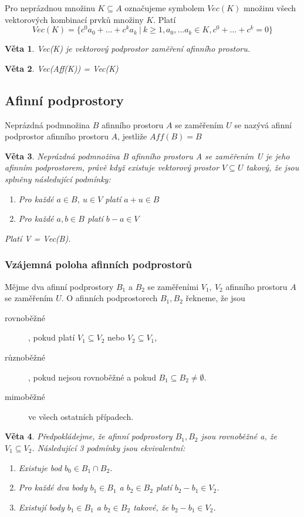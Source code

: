 \documentclass[12pt,a4paper]{article}
\newtheorem{sentence}{Věta}
\begin{document}
Pro neprázdnou množinu $K \subseteq A$ označujeme symbolem $Vec(K)$ množinu všech vektorových kombinací prvků množiny $K$. Platí $$Vec(K) = \{ c^0a_0 + \dots + c^ka_k \ | \ k \geq 1, a_0,\dots a_k \in K, c^0 + \dots + c^k = 0\}$$

\begin{sentence}
	Vec(K) je vektorový podprostor zaměření afinního prostoru.
\end{sentence}

\begin{sentence}
	Vec(Aff(K)) = Vec(K) 
\end{sentence}

\subsection{Afinní podprostory}
Neprázdná podmnožina $B$ afinního prostoru $A$ se zaměřením $U$ se nazývá afinní podprostor afinního prostoru $A$, jestliže $Aff(B) = B$

\begin{sentence}
	Neprázdná podmnožina B afinního prostoru A se zaměřením U je jeho afinním podprostorem, právě když existuje vektorový prostor $V \subseteq U$ takový, že jsou splněny následující podmínky: 
	\begin{enumerate}
		\item Pro každé $a \in B, \ u \in V$ platí $a + u \in B$
		\item Pro každé $a,b \in B$ platí $b - a \in V$
	\end{enumerate}
	Platí V = Vec(B).
\end{sentence}

\subsubsection{Vzájemná poloha afinních podprostorů}
Mějme dva afinní podprostory $B_1$ a $B_2$ se zaměřeními $V_1,\ V_2$ afinního prostoru $A$ se zaměřením $U$. O afinních podprostorech $B_1,B_2$ řekneme, že jsou 
\begin{description}
	\item[rovnoběžné], pokud platí $V_1 \subseteq V_2$ nebo $V_2 \subseteq V_1$,
	\item[různoběžné], pokud nejsou rovnoběžné a pokud $B_1 \subseteq B_2 \not= \emptyset$.
	\item[mimoběžné] ve všech ostatních případech. 
\end{description}

\begin{sentence}
	Předpokládejme, že afinní podprostory $B_1,B_2$ jsou rovnoběžné a, že $V_1 \subseteq V_2$. Následující 3 podmínky jsou ekvivalentní:
	\begin{enumerate}
		\item Existuje bod $b_0 \in B_1 \cap B_2$.
		\item Pro každé dva body $b_1 \in B_1$ a $b_2 \in B_2$ platí $b_2 - b_1 \in V_2$.
		\item Existují body $b_1 \in B_1$ a $b_2 \in B_2$ takové, že $b_2 - b_1 \in V_2$. 
	\end{enumerate}
\end{sentence}
\end{document}
